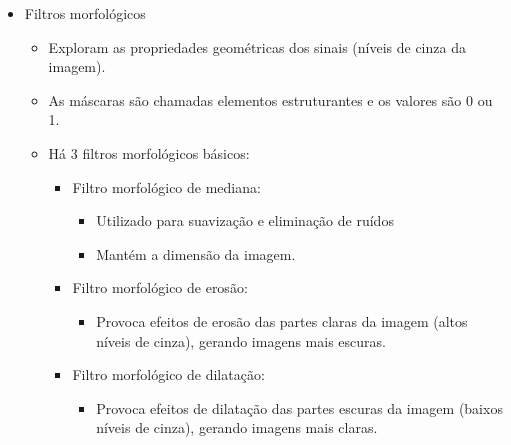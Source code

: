 \documentclass{article}
\begin{document}
\begin{itemize}
\begin{itemize}
\begin{itemize}
\begin{itemize}
$$\begin{array}{c c c}
                -2 & 0 & 2\\
                -1 & 0 & 1\\
                \end{array}\right]$$
                \item Em cada pixel, o resultado será dado pela equação: 
                $$a'= \sqrt{a^2+b^2}$$
                \item Onde a’ é o nível de cinza corresponde à localização do elemento central da máscara. 
                \end{itemize}
        \end{itemize}
    \end{itemize}
    \item Filtros morfológicos
    \begin{itemize}
        \item Exploram as propriedades geométricas dos sinais (níveis de cinza da imagem).  
        \item As máscaras são chamadas elementos estruturantes e os valores são 0 ou 1.
        \item Há 3 filtros morfológicos básicos:
        \begin{itemize}
            \item Filtro morfológico de mediana:
            \begin{itemize}
                \item Utilizado para suavização e eliminação de ruídos
                \item Mantém a dimensão da imagem.
            \end{itemize}
            \item Filtro morfológico de erosão:
            \begin{itemize}
                \item Provoca efeitos de erosão das partes claras da imagem (altos níveis de cinza), gerando imagens mais escuras.
            \end{itemize}
            \item Filtro morfológico de dilatação:
            \begin{itemize}
                \item Provoca efeitos de dilatação das partes escuras da imagem (baixos níveis de cinza), gerando imagens mais claras. 
            \end{itemize}
        \end{itemize}
    \end{itemize}
\end{itemize}
\end{document}
